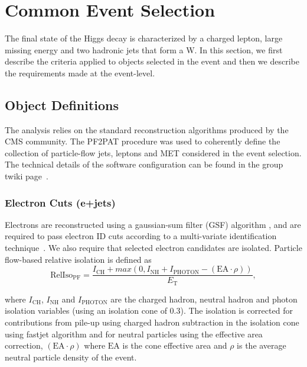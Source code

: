 \section{Common Event Selection}
\label{sec:firstStep}

The final state of the Higgs decay is characterized by a charged lepton, 
large missing energy and two hadronic jets that form a W.
In this section, we first describe the criteria applied to objects
selected in the event and then we describe the requirements made at
the event-level.

\subsection{Object Definitions}

The analysis relies on the standard reconstruction algorithms produced
by the CMS community. 
The PF2PAT procedure was used to coherently define the collection of particle-flow jets, leptons and
MET considered in the event selection.  
The technical details of the software configuration can be found in the group twiki page~\cite{WG_PATtuple_twiki}. 

\subsubsection{Electron Cuts (e+jets)}
\label{sec:electron_cuts}

Electrons are reconstructed using a gaussian-sum filter (GSF)
algorithm \cite{CMS-PAS-EGM-10-004}, and are required to pass electron
ID cuts according to a multi-variate identification
technique~\cite{cite:elemva}.  We also require that selected
electron candidates are isolated. Particle flow-based relative
isolation is defined as
\begin{equation*}
\mathrm{RelIso_{\mathrm{PF}}} = \frac{I_{\mathrm{CH}}+max(0,I_{\mathrm{NH}}+I_{\mathrm{PHOTON}}-(\mathrm{EA}\cdot\rho))}{E_\mathrm{T}},
\end{equation*} 

where $I_{\mathrm{CH}}$, $I_{\mathrm{NH}}$ and $I_{\mathrm{PHOTON}}$
are the charged hadron, neutral hadron and photon isolation variables
(using an isolation cone of 0.3). The isolation is corrected for
contributions from pile-up using charged hadron subtraction in the
isolation cone using fastjet algorithm \cite{FastJetPUSubtraction} and
for neutral particles using the effective area correction,
$(\mathrm{EA}\cdot\rho)$ where $\mathrm{EA}$ is the cone effective area
and $\rho$ is the average neutral particle density of the event.

